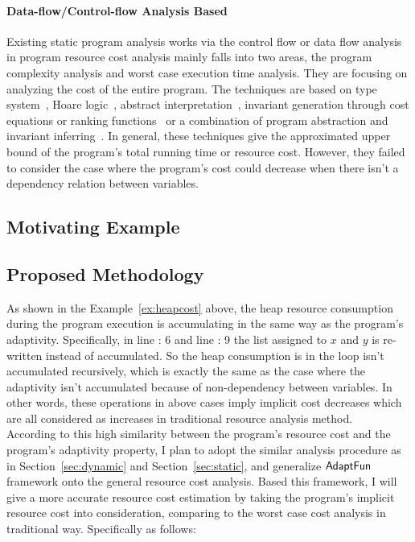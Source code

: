 \paragraph*{Data-flow/Control-flow Analysis Based}
Existing static program analysis works via the control flow or data flow analysis 
in program resource cost analysis 
mainly falls into two areas, the program complexity analysis and worst case execution time analysis. 
They are focusing on analyzing the cost of the entire program. 
The techniques are based on
type system~\cite{CicekBG0H17, RajaniG0021}, Hoare logic~\cite{CarbonneauxHS15}, abstract interpretation~\cite{GustafssonEL05, HumenbergerJK18},
invariant generation through cost equations or ranking functions~\cite{BrockschmidtEFFG16,AlbertAGP08,AliasDFG10,Flores-MontoyaH14}
or a combination of program abstraction and invariant inferring~\cite{GulwaniZ10, SinnZV17,GulwaniJK09}.
In general, these techniques give the approximated upper bound of the program's total running time or resource cost.
However, they failed to consider the case where the program's cost could decrease when there isn't a dependency relation between variables.

\subsection{Motivating Example}
\label{subsubsec:furthers-cost-example}

\subsection{Proposed Methodology}
\label{subsubsec:furthers-cost-methodology}
As shown in the Example~\ref{ex:heapcost} above, the heap resource consumption during the program 
execution is accumulating in the same way as the program's adaptivity. 
Specifically, in line : 6 and line :  9
the list assigned to $x$ and $y$ is re-written instead of accumulated.
So the heap consumption is in the loop isn't accumulated recursively, which is exactly
the same as the case where the adaptivity isn't accumulated because of non-dependency between variables.
In other words, these operations in above cases imply implicit cost decreases 
which are all considered as increases in traditional resource analysis 
method.
\\
According to this high similarity between the program's resource cost and the 
program's adaptivity property, I plan to adopt the similar analysis procedure as in Section~\ref{sec:dynamic} and 
Section~\ref{sec:static},
and generalize 
$\textsf{AdaptFun}$ framework onto the general resource cost analysis. 
Based this framework,
I will give
a more accurate resource cost estimation by taking the program's implicit resource cost into consideration, comparing 
to the worst case cost analysis in traditional way. Specifically as follows:
